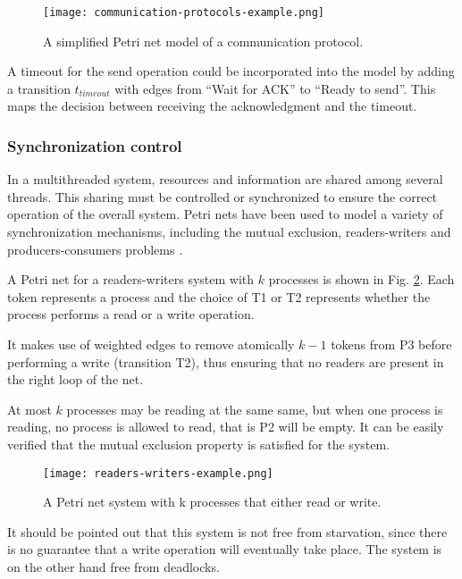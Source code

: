 \begin{figure}[H]
    \centering
    \texttt{[image: communication-protocols-example.png]}
    \caption{A simplified Petri net model of a communication protocol.}
    \label{fig:communication-protocols-example}
\end{figure}

A timeout for the send operation could be incorporated into the model
by adding a transition $t_{timeout}$ with edges from ``Wait for ACK'' to ``Ready to send''.
This maps the decision between receiving the acknowledgment and the timeout.

\subsubsection{Synchronization control}

In a multithreaded system, resources and information are shared among several threads.
This sharing must be controlled or synchronized to ensure the correct operation of the overall system.
Petri nets have been used to model a variety of synchronization mechanisms,
including the mutual exclusion, readers-writers and producers-consumers problems \cite{murata1989}.

A Petri net for a readers-writers system with $k$ processes is shown in Fig. \ref{fig:readers-writers-example}.
Each token represents a process and the choice of T1 or T2
represents whether the process performs a read or a write operation.

It makes use of weighted edges to remove atomically
$k - 1$ tokens from P3 before performing a write (transition T2),
thus ensuring that no readers are present in the right loop of the net.

At most $k$ processes may be reading at the same same,
but when one process is reading, no process is allowed to read, that is P2 will be empty.
It can be easily verified that the mutual exclusion property is satisfied for the system.

\begin{figure}[H]
    \centering
    \texttt{[image: readers-writers-example.png]}
    \caption{A Petri net system with k processes that either read or write.}
    \label{fig:readers-writers-example}
\end{figure}

It should be pointed out that this system is not free from starvation,
since there is no guarantee that a write operation will eventually take place.
The system is on the other hand free from deadlocks.

